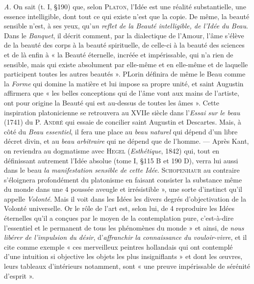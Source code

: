 {\it A.} On sait (t. I, \S 190) que, selon \textsc{Platon}, l’Idée est une réalité substantielle,
une essence intelligible, dont tout ce qui existe n’est que la copie.
De même, la beauté sensible n’est, à ses yeux, qu’{\it un reflet de la Beauté intelligible,
de l’Idée du Beau}. Dans le {\it Banquet}, il décrit comment, par la dialectique
de l'Amour, l'âme s'élève de la beauté des corps à la beauté spirituelle,
de celle-ci à la beauté des sciences et de là enfin à « la Beauté éternelle,
incréée et impérissable, qui n’a rien de sensible, mais qui existe
absolument par elle-même et en elle-même et de laquelle participent toutes
les autres beautés ». PLorin définira de même le Beau comme la {\it Forme}
qui domine la matière et lui impose sa propre unité, et saint Augustin
affirmera que « les belles conceptions qui de l’âme vont aux mains de
l'artiste, ont pour origine la Beauté qui est au-dessus de toutes les âmes ».
Cette inspiration platonicienne se retrouvera au XVIIe siècle dans l'{\it Essai
sur le beau} (1741) du P. \textsc{André} qui essaie de concilier saint Augustin et
Descartes. Mais, à côté du {\it Beau essentiel}, il fera une place au {\it beau naturel}
qui dépend d’un libre décret divin, et au {\it beau arbitraire} qui ne dépend
que de l’homme. — Après Kant, on reviendra au dogmatisme avec \textsc{Hegel}
({\it Esthétique}, 1842) qui, tout en définissant autrement l’Idée absolue (tome I,
\S 115 B et 190 D), verra lui aussi dans le beau {\it la manifestation sensible de
cette Idée}. \textsc{Schopenhaur} au contraire s’éloignera profondément du platonisme en
faisant consister la substance même du monde dans une 4 poussée
aveugle et irrésistible », une sorte d'instinct qu'il appelle {\it Volonté}. Mais il
voit dans les Idées les divers degrés d’objectivation de la Volonté universelle.
Or le rôle de l'art est, selon lui, de 4 reproduire les Idées éternelles
qu'il a conçues par le moyen de la contemplation pure, c'est-à-dire l'essentiel
et le permanent de tous les phénomènes du monde » et ainsi, de {\it nous
libérer de l'impulsion du désir}, d'{\it affranchir la connaissance du vouloir-vivre},
et il cite comme exemple « ces merveilleux peintres hollandais qui
ont contemplé d'une intuition si objective les objets les plus insigniflants »
et dont les œuvres, leurs tableaux d’intérieurs notamment, sont « une preuve
impérissable de sérénité d'esprit ».

